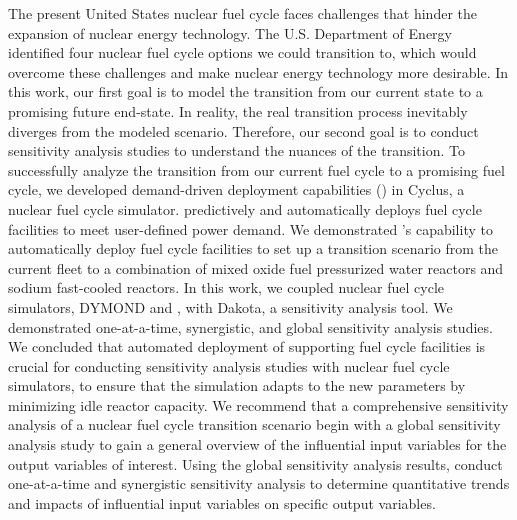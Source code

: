 \vspace{-0.2in}
The present United States nuclear fuel cycle faces challenges that hinder 
the expansion of nuclear energy technology. 
The U.S. Department of Energy identified four nuclear fuel cycle 
options we could transition to, which would overcome these challenges 
and make nuclear energy technology more desirable. 
In this work, our first goal is to model the transition from our current
state to a promising future end-state.
In reality, the real transition process inevitably diverges from the 
modeled scenario. 
Therefore, our second goal is to conduct sensitivity analysis 
studies to understand the nuances of the transition. 
To successfully analyze the transition from our current fuel cycle to 
a promising fuel cycle, we developed demand-driven deployment capabilities 
(\deploy) in Cyclus, a nuclear fuel cycle simulator. 
\deploy predictively and automatically deploys fuel cycle facilities 
to meet user-defined power demand.
We demonstrated \deploy's capability to automatically deploy fuel 
cycle facilities to set up a transition scenario from the current 
fleet to a combination of mixed oxide fuel pressurized water reactors 
and sodium fast-cooled reactors. 
In this work, we coupled nuclear fuel cycle simulators, DYMOND 
and \Cyclus, with Dakota, a sensitivity analysis tool. 
We demonstrated 
one-at-a-time, synergistic, and global sensitivity analysis studies.
We concluded that automated deployment of supporting fuel cycle 
facilities is crucial for conducting sensitivity analysis studies 
with nuclear fuel cycle simulators, to ensure that the simulation 
adapts to the new parameters by minimizing idle reactor capacity. 
We recommend that a comprehensive sensitivity analysis of a 
nuclear fuel cycle transition scenario begin with a global 
sensitivity analysis study to gain a general overview of the 
influential input variables for the output variables of interest. 
Using the global sensitivity analysis results, 
conduct one-at-a-time and synergistic sensitivity 
analysis to determine quantitative trends and impacts of influential 
input variables on specific output variables.
